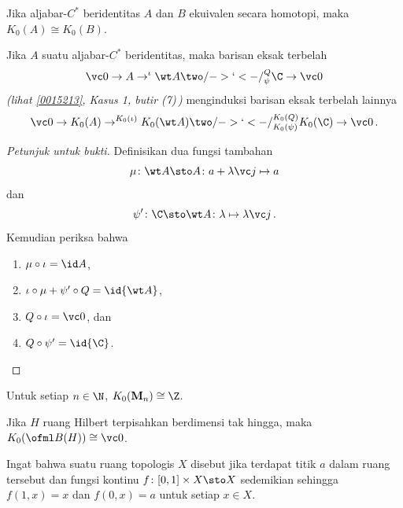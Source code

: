 \begin{prop}\label{0062331} Jika aljabar-$C^*$ beridentitas $A$ dan $B$
ekuivalen secara homotopi, maka $K_0(A) \cong K_0(B)$.
\end{prop}

\begin{prop}\label{0062334} Jika $A$ suatu aljabar-$C^*$ beridentitas, maka barisan eksak terbelah
   \begin{equation}\label{0062334i}
      \vc 0 \to A \to^\iota \wt A \two/->`<-/^Q_\psi \C \to \vc 0
   \end{equation}
\emph{(lihat \ref{0015213}, Kasus 1, butir (7)\,)} menginduksi barisan eksak terbelah lainnya
   \begin{equation}\label{0062334ii}
      \vc 0 \to K_0(A) \to^{K_0(\iota)} K_0(\wt A) \two/->`<-/^{K_0(Q)}_{K_0(\psi)} K_0(\C) \to \vc 0 \,.
   \end{equation}
\end{prop}

\begin{proof}[\emph{Petunjuk untuk bukti}] Definisikan dua fungsi tambahan
   \[ \mu\colon \wt A \sto A\colon a + \lambda \vc j \mapsto a \]
dan
   \[ \psi' \colon \C \sto \wt A \colon \lambda \mapsto \lambda \vc j\,. \]
Kemudian periksa bahwa
   \begin{enumerate}[label=\rm{(\alph*)}]
     \item $\mu \circ \iota = \id A$,
     \item $\iota \circ \mu + \psi' \circ Q = \id{\wt A}$,
     \item $Q \circ \iota = \vc 0$, dan
     \item $Q \circ \psi' = \id{\C}$. %
   \end{enumerate}   \ns
\end{proof}

\begin{exam} Untuk setiap $n \in \N$,
$K_0(\mathbf M_n) \cong \Z$.
\end{exam}

\begin{exam} Jika $H$ ruang Hilbert terpisahkan berdimensi tak hingga,
maka $K_0(\ofml B(H)) \cong \vc 0$.
\end{exam}

\begin{defn} Ingat bahwa suatu ruang topologis $X$ disebut
 jika terdapat titik $a$ dalam ruang tersebut dan fungsi kontinu $f\colon [0,1] \times X \sto X$ sedemikian sehingga $f(1,x) = x$
dan $f(0,x) = a$ untuk setiap $x \in X$.
\end{defn}

